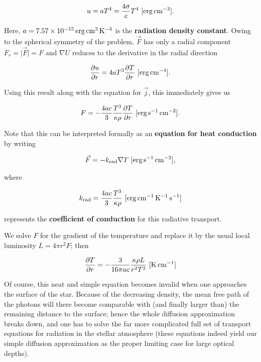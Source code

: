 \documentclass[a4paper,10pt]{article}
\begin{document}
\begin{align*}
    u = aT^4 = \frac{4\sigma}{c}T^4 ~ [{\rm erg\,cm^{-3}}].
\end{align*}

{\noindent}Here, $a=7.57\times10^{-15}\,{\rm erg\,cm^{3}\,K^{-4}}$ is the \textbf{radiation density constant}. Owing to the spherical symmetry of the problem, $\vec{F}$ has only a radial component $F_r=\lvert\vec{F}\rvert=F$ and $\nabla U$ reduces to the derivative in the radial direction

\begin{align*}
    \frac{\partial u}{\partial r} = 4aT^3\frac{\partial T}{\partial r} ~ [{\rm erg\,cm^{-4}}].
\end{align*}

{\noindent}Using this result along with the equation for $\vec{j}$, this immediately gives us

\begin{align*}
    F = - \frac{4ac}{3} \frac{T^3}{\kappa\rho} \frac{\partial T}{\partial r} ~ [{\rm erg\,s^{-1}\,cm^{-2}}].
\end{align*}

{\noindent}Note that this can be interpreted formally as an \textbf{equation for heat conduction} by writing

\begin{align*}
    \vec{F} = -k_{\rm rad}\nabla T ~ [{\rm erg\,s^{-1}\,cm^{-2}}],
\end{align*}

{\noindent}where 

\begin{align*}
    k_{\rm rad} = \frac{4ac}{3} \frac{T^3}{\kappa\rho} ~ [{\rm erg\,cm^{-1}\,K^{-1}\,s^{-1}}]
\end{align*}

{\noindent}represents the \textbf{coefficient of conduction} for this radiative transport.

{\noindent}We solve $F$ for the gradient of the temperature and replace it by the usual local luminosity $L=4\pi r^2F$; then

\begin{align*}
    \frac{\partial T}{\partial r} = - \frac{3}{16\pi ac} \frac{\kappa\rho L}{r^2T^3} ~ [{\rm K\,cm^{-1}}]
\end{align*}

{\noindent}Of course, this neat and simple equation becomes invalid when one approaches the surface of the star. Because of the decreasing density, the mean free path of the photons will there become comparable with (and finally larger than) the remaining distance to the surface; hence the whole diffusion approximation breaks down, and one has to solve the far more complicated full set of transport equations for radiation in the stellar atmosphere (these equations indeed yield our simple diffusion approximation as the proper limiting case for large optical depths).
\end{document}

